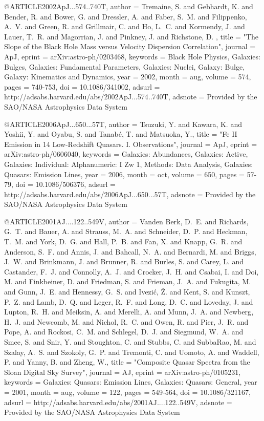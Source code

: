 \documentclass[twocolumn]{aastex62}
\def\aj{{AJ}}\def\actaa{{Acta Astron.}}\def\araa{{ARA\&A}}\def\apj{{ApJ}}\def\apjl{{ApJ}}\def\apjs{{ApJS}}\def\aap{{A\&A}}\def\aapr{{A\&A~Rev.}}\def\aaps{{A\&AS}}\def\apss{{Ap\&SS}}\def\baas{{BAAS}}\def\caa{{Chinese Astron. Astrophys.}}\def\cjaa{{Chinese J. Astron. Astrophys.}}\def\icarus{{Icarus}}\def\jcap{{J. Cosmology Astropart. Phys.}}\def\jrasc{{JRASC}}\def\memras{{MmRAS}}\def\mnras{{MNRAS}}\def\na{{New A}}\def\nar{{New A Rev.}}\def\pra{{Phys.~Rev.~A}}\def\prb{{Phys.~Rev.~B}}\def\prc{{Phys.~Rev.~C}}\def\prd{{Phys.~Rev.~D}}\def\pre{{Phys.~Rev.~E}}\def\prl{{Phys.~Rev.~Lett.}}\def\pasa{{PASA}}\def\pasp{{PASP}}\def\pasj{{PASJ}}
\begin{document}
{{{{{@ARTICLE{2002ApJ...574..740T,
   author = {{Tremaine}, S. and {Gebhardt}, K. and {Bender}, R. and {Bower}, G. and 
	{Dressler}, A. and {Faber}, S.~M. and {Filippenko}, A.~V. and 
	{Green}, R. and {Grillmair}, C. and {Ho}, L.~C. and {Kormendy}, J. and 
	{Lauer}, T.~R. and {Magorrian}, J. and {Pinkney}, J. and {Richstone}, D.
	},
    title = "{The Slope of the Black Hole Mass versus Velocity Dispersion Correlation}",
  journal = {\apj},
   eprint = {arXiv:astro-ph/0203468},
 keywords = {Black Hole Physics, Galaxies: Bulges, Galaxies: Fundamental Parameters, Galaxies: Nuclei, Galaxy: Bulge, Galaxy: Kinematics and Dynamics},
     year = 2002,
    month = aug,
   volume = 574,
    pages = {740-753},
      doi = {10.1086/341002},
   adsurl = {http://adsabs.harvard.edu/abs/2002ApJ...574..740T},
  adsnote = {Provided by the SAO/NASA Astrophysics Data System}
}


@ARTICLE{2006ApJ...650...57T,
   author = {{Tsuzuki}, Y. and {Kawara}, K. and {Yoshii}, Y. and {Oyabu}, S. and 
	{Tanab{\'e}}, T. and {Matsuoka}, Y.},
    title = "{Fe II Emission in 14 Low-Redshift Quasars. I. Observations}",
  journal = {\apj},
   eprint = {arXiv:astro-ph/0606040},
 keywords = {Galaxies: Abundances, Galaxies: Active, Galaxies: Individual: Alphanumeric: I Zw 1, Methods: Data Analysis, Galaxies: Quasars: Emission Lines},
     year = 2006,
    month = oct,
   volume = 650,
    pages = {57-79},
      doi = {10.1086/506376},
   adsurl = {http://adsabs.harvard.edu/abs/2006ApJ...650...57T},
  adsnote = {Provided by the SAO/NASA Astrophysics Data System}
}


@ARTICLE{2001AJ....122..549V,
   author = {{Vanden Berk}, D.~E. and {Richards}, G.~T. and {Bauer}, A. and 
	{Strauss}, M.~A. and {Schneider}, D.~P. and {Heckman}, T.~M. and 
	{York}, D.~G. and {Hall}, P.~B. and {Fan}, X. and {Knapp}, G.~R. and 
	{Anderson}, S.~F. and {Annis}, J. and {Bahcall}, N.~A. and {Bernardi}, M. and 
	{Briggs}, J.~W. and {Brinkmann}, J. and {Brunner}, R. and {Burles}, S. and 
	{Carey}, L. and {Castander}, F.~J. and {Connolly}, A.~J. and 
	{Crocker}, J.~H. and {Csabai}, I. and {Doi}, M. and {Finkbeiner}, D. and 
	{Friedman}, S. and {Frieman}, J.~A. and {Fukugita}, M. and {Gunn}, J.~E. and 
	{Hennessy}, G.~S. and {Ivezi{\'c}}, {\v Z}. and {Kent}, S. and 
	{Kunszt}, P.~Z. and {Lamb}, D.~Q. and {Leger}, R.~F. and {Long}, D.~C. and 
	{Loveday}, J. and {Lupton}, R.~H. and {Meiksin}, A. and {Merelli}, A. and 
	{Munn}, J.~A. and {Newberg}, H.~J. and {Newcomb}, M. and {Nichol}, R.~C. and 
	{Owen}, R. and {Pier}, J.~R. and {Pope}, A. and {Rockosi}, C.~M. and 
	{Schlegel}, D.~J. and {Siegmund}, W.~A. and {Smee}, S. and {Snir}, Y. and 
	{Stoughton}, C. and {Stubbs}, C. and {SubbaRao}, M. and {Szalay}, A.~S. and 
	{Szokoly}, G.~P. and {Tremonti}, C. and {Uomoto}, A. and {Waddell}, P. and 
	{Yanny}, B. and {Zheng}, W.},
    title = "{Composite Quasar Spectra from the Sloan Digital Sky Survey}",
  journal = {\aj},
   eprint = {arXiv:astro-ph/0105231},
 keywords = {Galaxies: Quasars: Emission Lines, Galaxies: Quasars: General},
     year = 2001,
    month = aug,
   volume = 122,
    pages = {549-564},
      doi = {10.1086/321167},
   adsurl = {http://adsabs.harvard.edu/abs/2001AJ....122..549V},
  adsnote = {Provided by the SAO/NASA Astrophysics Data System}
}


}}}}}
\end{document}
